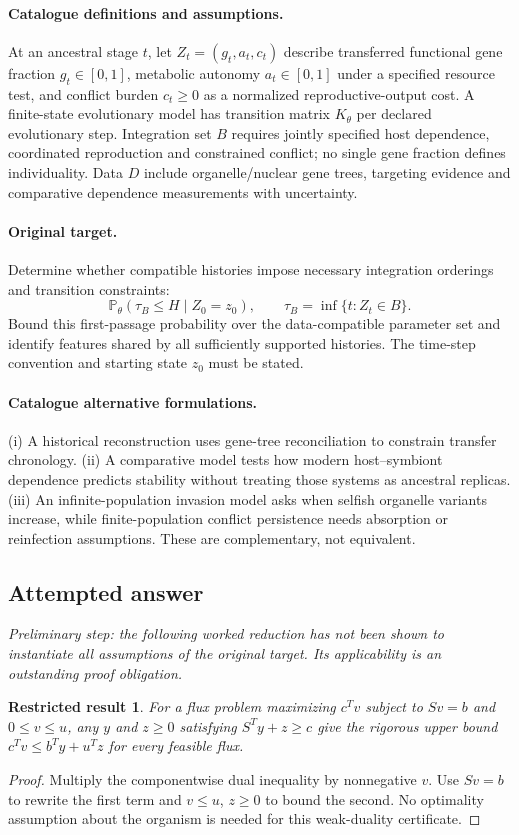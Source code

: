 \documentclass[11pt]{article}
\newcommand{\Prob}{\mathbb P}
\providecommand{\Prob}{\mathbb P}
\newtheorem{attemptresult}{Restricted result}[section]
\begin{document}
\paragraph{Catalogue definitions and assumptions.}
At an ancestral stage $t$, let $Z_t=(g_t,a_t,c_t)$ describe transferred functional gene fraction $g_t\in[0,1]$, metabolic autonomy $a_t\in[0,1]$ under a specified resource test, and conflict burden $c_t\geq0$ as a normalized reproductive-output cost. A finite-state evolutionary model has transition matrix $K_\theta$ per declared evolutionary step. Integration set $B$ requires jointly specified host dependence, coordinated reproduction and constrained conflict; no single gene fraction defines individuality. Data $D$ include organelle/nuclear gene trees, targeting evidence and comparative dependence measurements with uncertainty.
\paragraph{Original target.}
Determine whether compatible histories impose necessary integration orderings and transition constraints:
    \[\Prob_\theta(\tau_B\leq H\mid Z_0=z_0),\qquad
    \tau_B=\inf\{t:Z_t\in B\}.\]
    Bound this first-passage probability over the data-compatible parameter set and identify features shared by all sufficiently supported histories. The time-step convention and starting state $z_0$ must be stated.
\paragraph{Catalogue alternative formulations.}
(i) A historical reconstruction uses gene-tree reconciliation to constrain transfer chronology. (ii) A comparative model tests how modern host--symbiont dependence predicts stability without treating those systems as ancestral replicas. (iii) An infinite-population invasion model asks when selfish organelle variants increase, while finite-population conflict persistence needs absorption or reinfection assumptions. These are complementary, not equivalent.
\subsection{Attempted answer}
\noindent\emph{Preliminary step: the following worked reduction has not been shown to instantiate all assumptions of the original target. Its applicability is an outstanding proof obligation.}

\begin{attemptresult}
For a flux problem maximizing $c^Tv$ subject to $Sv=b$ and $0\leq v\leq u$, any $y$ and $z\geq0$ satisfying $S^Ty+z\geq c$ give the rigorous upper bound $c^Tv\leq b^Ty+u^Tz$ for every feasible flux.
\end{attemptresult}
\begin{proof}
Multiply the componentwise dual inequality by nonnegative $v$. Use $Sv=b$ to rewrite the first term and $v\leq u$, $z\geq0$ to bound the second. No optimality assumption about the organism is needed for this weak-duality certificate.
\end{proof}
\end{document}
